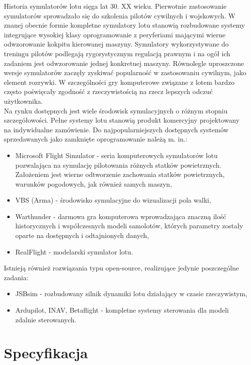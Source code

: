 \documentclass[15pt]{sprawozdanie}
\begin{document}
Historia symulatorów lotu sięga lat 30. XX wieku. Pierwotnie zastosowanie symulatorów sprowadzało się do szkolenia pilotów cywilnych i wojskowych. W znanej obecnie formie kompletne symulatory lotu stanowią rozbudowane systemy integrujące wysokiej klasy oprogramowanie z peryferiami mającymi wierne odwzorowanie kokpitu kierowanej maszyny. Symulatory wykorzystywane do treningu pilotów podlegają rygorystycznym regulacją prawnym i na ogół ich zadaniem jest odwzorowanie jednej konkretnej maszyny. Równolegle uproszczone wersje symulatorów zaczęły zyskiwać popularność w zastosowaniu cywilnym, jako element rozrywki. W szczególności gry komputerowe związane z lotem bardzo często poświęcały zgodność z rzeczywistością na rzecz lepszych odczuć użytkownika.\\

Na rynku dostępnych jest wiele środowisk symulacyjnych o różnym stopniu szczegółowości. Pełne systemy lotu stanowią produkt komercyjny projektowany na indywidualne zamówienie. Do najpopularniejszych dostępnych systemów sprzedawanych jako zamknięte oprogramowanie należą m. in.:

\begin{itemize}
\item Microsoft Flight Simulator -  seria komputerowych symulatorów lotu pozwalająca na symulację pilotowania różnych statków powietrznych. Założeniem jest wierne odtworzenie zachowania statków powietrznych, warunków pogodowych, jak również samych maszyn,
\item VBS (Arma) - środowisko symulacyjne do wizualizacji pola walki,
\item Warthunder - darmowa gra komputerowa wprowadzająca znaczną ilość historycznych i współczesnych modeli samolotów, których parametry zostały oparte na dostępnych i odtajnionych danych,
\item RealFlight - modelarski symulator lotu.
\end{itemize}

Istnieją również rozwiązania typu open-source, realizujące jedynie poszczególne zadania:

\begin{itemize}
\item JSBsim - rozbudowany silnik dynamiki lotu działający w czasie rzeczywistym,
\item Ardupilot, INAV, Betaflight - kompletne systemy sterowania dla modeli zdalnie sterowanych.
\end{itemize}


\section{Specyfikacja}
\end{document}
